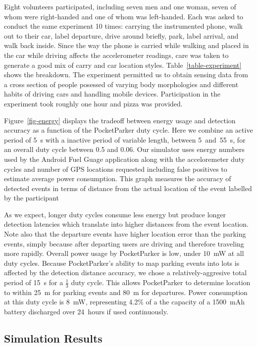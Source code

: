 Eight volunteers participated, including seven men and one woman, seven of
whom were right-handed and one of whom was left-handed. Each was asked to
conduct the same experiment 10 times: carrying the instrumented phone, walk
out to their car, label departure, drive around briefly, park, label arrival,
and walk back inside. Since the way the phone is carried while walking and
placed in the car while driving affects the accelerometer readings, care was
taken to generate a good mix of carry and car location styles.
Table~\ref{table-experiment} shows the breakdown. The experiment permitted us
to obtain sensing data from a cross section of people posessed of varying
body morphologies and different habits of driving cars and handling mobile
devices. Participation in the experiment took roughly one hour and pizza was
provided.

Figure~\ref{fig-energy} displays the tradeoff between energy usage and
detection accuracy as a function of the PocketParker duty cycle. Here we
combine an active period of 5~s with a inactive period of variable length,
between 5~and~55~s, for an overall duty cycle between 0.5 and 0.06. Our
simulator uses energy numbers used by the Android Fuel Guage application
along with the acceloremeter duty cycles and number of GPS locations
requested including false positives to estimate average power consumption.
This graph measures the accuracy of detected events in terms of distance from
the actual location of the event labelled by the participant

As we expect, longer duty cycles consume less energy but produce longer
detection latencies which translate into higher distances from the event
location. Note also that the departure events have higher location error than
the parking events, simply because after departing users are driving and
therefore traveling more rapidly. Overall power usage by PocketParker is low,
under 10~mW at all duty cycles. Because PocketParker's ability to map parking
events into lots is affected by the detection distance accuracy, we chose a
relatively-aggresive total period of 15~s for a $\frac{1}{3}$ duty cycle.
This allows PocketParker to determine location to within 25~m for parking
events and 80~m for departures. Power consumption at this duty cycle is 8~mW,
representing 4.2\% of a the capacity of a 1500~mAh battery discharged over
24~hours if used continuously.

\subsection{Simulation Results}
\label{subsec-simulator}


